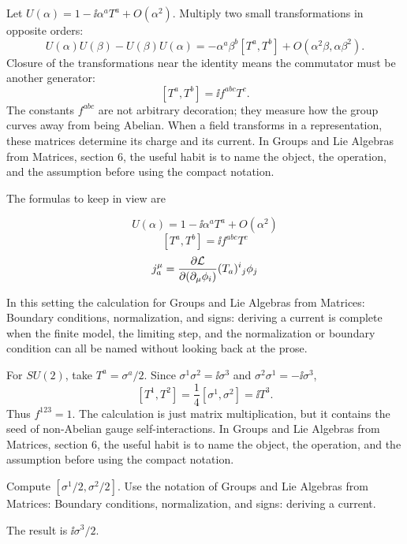 Let \(U(\alpha)=1-\ii\alpha^aT^a+O(\alpha^2)\).  Multiply two small transformations in opposite orders:
\[
  U(\alpha)U(\beta)-U(\beta)U(\alpha)
  =
  -\alpha^a\beta^b[T^a,T^b]+O(\alpha^2\beta,\alpha\beta^2).
\]
Closure of the transformations near the identity means the commutator must be another generator:
\[
  [T^a,T^b]=\ii f^{abc}T^c.
\]
The constants \(f^{abc}\) are not arbitrary decoration; they measure how the group curves away from being Abelian.  When a field transforms in a representation, these matrices determine its charge and its current.  In Groups and Lie Algebras from Matrices, section 6, the useful habit is to name the object, the operation, and the assumption before using the compact notation.

The formulas to keep in view are

\[
  U(\alpha)=1-\ii\alpha^aT^a+O(\alpha^2)
\]
\[
  [T^a,T^b]=\ii f^{abc}T^c
\]
\[
  j^\mu_a=\frac{\partial\mathcal L}{\partial(\partial_\mu\phi_i)}(T_a)^i{}_j\phi_j
\]

In this setting the calculation for Groups and Lie Algebras from Matrices: Boundary conditions, normalization, and signs: deriving a current is complete when the finite model, the limiting step, and the normalization or boundary condition can all be named without looking back at the prose.




\begin{example}
For \(SU(2)\), take \(T^a=\sigma^a/2\).  Since \(\sigma^1\sigma^2=\ii\sigma^3\) and \(\sigma^2\sigma^1=-\ii\sigma^3\),
\[
  [T^1,T^2]=\frac14[\sigma^1,\sigma^2]=\ii T^3.
\]
Thus \(f^{123}=1\).  The calculation is just matrix multiplication, but it contains the seed of non-Abelian gauge self-interactions.  In Groups and Lie Algebras from Matrices, section 6, the useful habit is to name the object, the operation, and the assumption before using the compact notation.
\end{example}



\begin{exercise}
Compute \([\sigma^1/2,\sigma^2/2]\).  Use the notation of Groups and Lie Algebras from Matrices: Boundary conditions, normalization, and signs: deriving a current.
\begin{answer}
The result is \(\ii\sigma^3/2\).
\end{answer}
\end{exercise}

